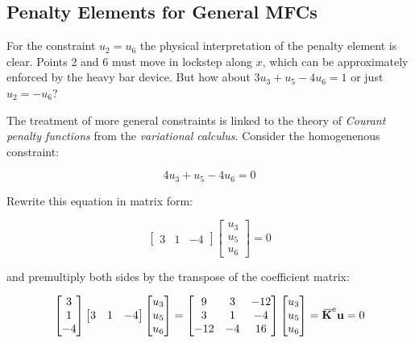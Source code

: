 \documentclass[10pt,b5paper,titlepage]{book}
\newcommand{\m}{\mathbf}
\newcommand{\closure}[2][3]{%
{}\mkern#1mu\overline{\mkern-#1mu#2}}
\begin{document}
\subsection{Penalty Elements for General MFCs}

For the constraint $ u_2 = u_6 $ the physical interpretation of the penalty
element is clear. Points 2 and 6 must move in lockstep along $ x $, which
can be approximately enforced by the heavy bar device. But how about
$ 3 u_3 + u_5 - 4 u_6 = 1 $ or just $ u_2 = -u_6 $?

The treatment of more general constraints is linked to the theory of
\textit{Courant penalty functions} from the \textit{variational calculus}.
Consider the homogenenous constraint:

\begin{equation}
    4 u_3 + u_5 - 4 u_6 = 0
\end{equation}

Rewrite this equation in matrix form:

\begin{equation}
    \begin{bmatrix}
        3 & 1 & -4
    \end{bmatrix}
    \begin{bmatrix}
        u_3 \\
        u_5 \\
        u_6
    \end{bmatrix}
    = 0
\end{equation}

and premultiply both sides by the transpose of the coefficient matrix:

\begin{equation}
    \begin{bmatrix}
        3 \\
        1 \\
        -4
    \end{bmatrix}
    \begin{bmatrix}
        3 & 1 & -4
    \end{bmatrix}
    \begin{bmatrix}
        u_3 \\
        u_5 \\
        u_6
    \end{bmatrix}
    =
    \begin{bmatrix}
        9 & 3 & -12 \\
        3 & 1 & -4 \\
        -12 & -4 & 16
    \end{bmatrix}
    \begin{bmatrix}
        u_3 \\
        u_5 \\
        u_6
    \end{bmatrix}
    = \m{\closure{K}}^e \m{u} = 0
\end{equation}
\end{document}
